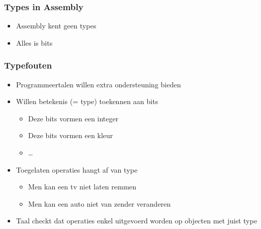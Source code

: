 \begin{frame}
  \frametitle{Types in Assembly}
  \begin{itemize}
    \item Assembly kent geen types
    \item Alles is bits
  \end{itemize}
\end{frame}

\begin{frame}
  \frametitle{Typefouten}
  \begin{itemize}
    \item Programmeertalen willen extra ondersteuning bieden
    \item Willen betekenis (= type) toekennen aan bits
          \begin{itemize}
            \item Deze bits vormen een integer
            \item Deze bits vormen een kleur
            \item \dots
          \end{itemize}
    \item Toegelaten operaties hangt af van type
          \begin{itemize}
            \item Men kan een tv niet laten remmen
            \item Men kan een auto niet van zender veranderen
          \end{itemize}
    \item Taal checkt dat operaties enkel uitgevoerd worden op objecten met juist type
  \end{itemize}
\end{frame}

